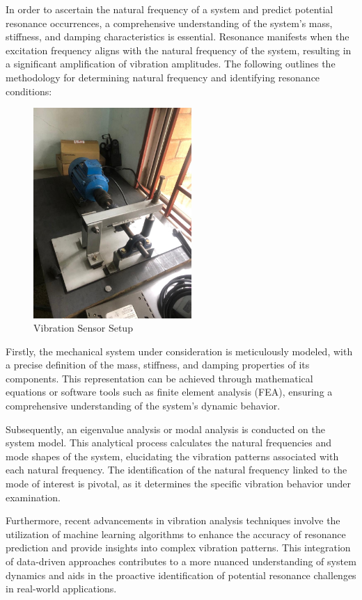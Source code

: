 In order to ascertain the natural frequency of a system and predict potential resonance occurrences, a comprehensive understanding of the system's mass, stiffness, and damping characteristics is essential. Resonance manifests when the excitation frequency aligns with the natural frequency of the system, resulting in a significant amplification of vibration amplitudes. The following outlines the methodology for determining natural frequency and identifying resonance conditions:

\begin{figure}[!h]
	\centering
	\includegraphics[width=0.7\linewidth, height=8cm]{Figures/motor_mount}
	\caption{Vibration Sensor Setup}
\end{figure}

Firstly, the mechanical system under consideration is meticulously modeled, with a precise definition of the mass, stiffness, and damping properties of its components. This representation can be achieved through mathematical equations or software tools such as finite element analysis (FEA), ensuring a comprehensive understanding of the system's dynamic behavior.

Subsequently, an eigenvalue analysis or modal analysis is conducted on the system model. This analytical process calculates the natural frequencies and mode shapes of the system, elucidating the vibration patterns associated with each natural frequency. The identification of the natural frequency linked to the mode of interest is pivotal, as it determines the specific vibration behavior under examination.

Furthermore, recent advancements in vibration analysis techniques involve the utilization of machine learning algorithms to enhance the accuracy of resonance prediction and provide insights into complex vibration patterns. This integration of data-driven approaches contributes to a more nuanced understanding of system dynamics and aids in the proactive identification of potential resonance challenges in real-world applications.


